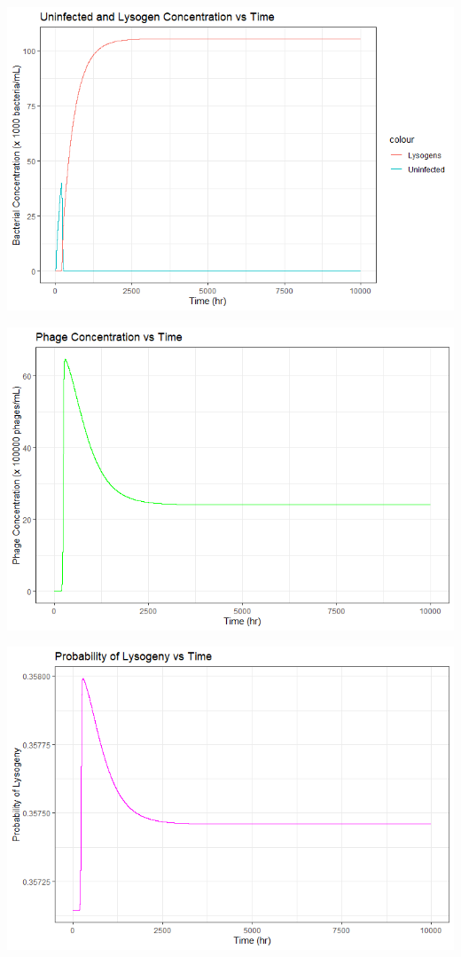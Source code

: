 \documentclass{article}
\begin{document}
\begin{center}
\includegraphics[scale=0.5]{plots/MOI_U_L.png}

\includegraphics[scale=0.5]{plots/MOI_P.png}

\includegraphics[scale=0.5]{plots/MOI_phi.png}
\end{center}
\end{document}
